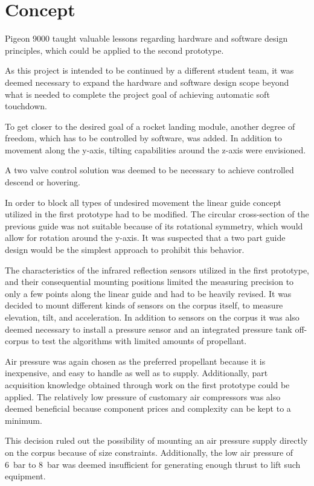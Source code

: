 \section{Concept}
\author{Sebastian Schaffler}

Pigeon 9000 taught valuable lessons regarding hardware and software design principles, which could be applied to the second prototype. 

As this project is intended to be continued by a different student team, it was deemed necessary to expand the hardware and software design scope beyond what is needed to complete the project goal of achieving automatic soft touchdown.

To get closer to the desired goal of a rocket landing module, another degree of freedom, which has to be controlled by software, was added. In addition to movement along the y-axis, tilting capabilities around the z-axis were envisioned. 

A two valve control solution was deemed to be necessary to achieve controlled descend or hovering. 

In order to block all types of undesired movement the linear guide concept utilized in the first prototype had to be modified. The circular cross-section of the previous guide was not suitable because of its rotational symmetry, which would allow for rotation around the y-axis. It was suspected that a two part guide design would be the simplest approach to prohibit this behavior.

The characteristics of the infrared reflection sensors utilized in the first prototype, and their consequential mounting positions  limited the measuring precision to only a few points along the linear guide and had to be heavily revised. It was decided to mount different kinds of sensors on the corpus itself, to measure elevation, tilt, and acceleration. In addition to sensors on the corpus it was also deemed necessary to install a pressure sensor and an integrated pressure tank off-corpus to test the algorithms with limited amounts of propellant.

Air pressure was again chosen as the preferred propellant because it is inexpensive, and easy to handle as well as to supply. Additionally, part acquisition knowledge obtained through work on the first prototype could be applied. The relatively low pressure of customary air compressors was also deemed beneficial because component prices and complexity can be kept to a minimum.

This decision ruled out the possibility of mounting an air pressure supply directly on the corpus because of size constraints. Additionally, the low air pressure of \SI{6}{\bar} to \SI{8}{\bar} was deemed insufficient for generating enough thrust to lift such equipment.

